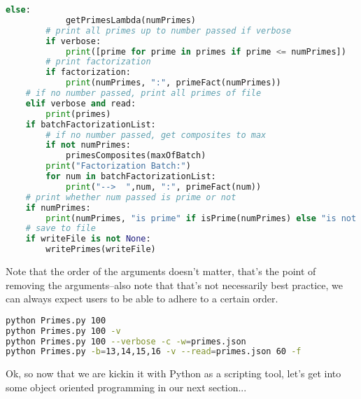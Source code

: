 \documentclass[12pt]{article}
\begin{document}
\begin{lstlisting}[language=Python]
        else:
            getPrimesLambda(numPrimes)
        # print all primes up to number passed if verbose
        if verbose:
            print([prime for prime in primes if prime <= numPrimes])
        # print factorization
        if factorization:
            print(numPrimes, ":", primeFact(numPrimes))
    # if no number passed, print all primes of file
    elif verbose and read:
        print(primes)
    if batchFactorizationList:
        # if no number passed, get composites to max
        if not numPrimes:
            primesComposites(maxOfBatch)
        print("Factorization Batch:")
        for num in batchFactorizationList:
            print("-->  ",num, ":", primeFact(num))
    # print whether num passed is prime or not
    if numPrimes:
        print(numPrimes, "is prime" if isPrime(numPrimes) else "is not prime")
    # save to file
    if writeFile is not None:
        writePrimes(writeFile)
\end{lstlisting}
Note that the order of the arguments doesn't matter, that's the point of removing the arguments--also note that that's not necessarily best practice, we can always expect users to be able to adhere to a certain order.\\
\begin{lstlisting}[language=sh]
python Primes.py 100
python Primes.py 100 -v
python Primes.py 100 --verbose -c -w=primes.json
python Primes.py -b=13,14,15,16 -v --read=primes.json 60 -f
\end{lstlisting}
Ok, so now that we are kickin it with Python as a scripting tool, let's get into some object oriented programming in our next section...\\

\\
\end{document}
